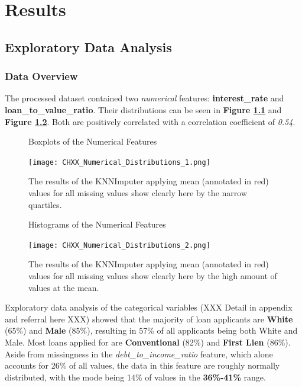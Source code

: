 \chapter{Results}\label{chap:Results}


\section{Exploratory Data Analysis}\label{sec:Exploratory_Data_Analysis}



\subsection{Data Overview}\label{subsec:Data_Overview}

The processed dataset contained two \textit{numerical} features: \textbf{interest\_rate} and \textbf{loan\_to\_value\_ratio}.
Their distributions can be seen in \textbf{Figure \ref{fig:CHXX_Numerical_Distributions_1}} and \textbf{Figure \ref{fig:CHXX_Numerical_Distributions_2}}.
Both are positively correlated with a correlation coefficient of \textit{0.54}. 

\begin{figure}[h]
    \centering
    \caption{Boxplots of the Numerical Features}
    \texttt{[image: CHXX\_Numerical\_Distributions\_1.png]}
    \caption*{The results of the KNNImputer applying mean (annotated in red) values for all missing values show clearly here by the narrow quartiles.}
    \label{fig:CHXX_Numerical_Distributions_1}
\end{figure}

\begin{figure}[h]
    \centering
    \caption{Histograms of the Numerical Features}
    \texttt{[image: CHXX\_Numerical\_Distributions\_2.png]}
    \caption*{The results of the KNNImputer applying mean (annotated in red) values for all missing values show clearly here by the high amount of values at the mean.}
    \label{fig:CHXX_Numerical_Distributions_2}
\end{figure}

Exploratory data analysis of the categorical variables (XXX Detail in appendix and referral here XXX) showed that the majority of loan applicants are \textbf{White} (65\%) and \textbf{Male} (85\%), resulting in 57\% of all applicants being both White and Male.
Most loans applied for are \textbf{Conventional} (82\%) and \textbf{First Lien} (86\%).
Aside from missingness in the \textit{debt\_to\_income\_ratio} feature, which alone accounts for 26\% of all values, the data in this feature are roughly normally distributed, with the mode being 14\% of values in the \textbf{36\%-41\%} range. 


